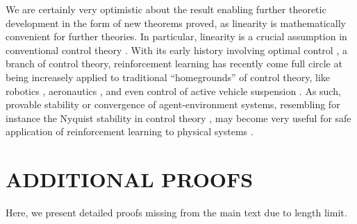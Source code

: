 \documentclass[twoside]{article}
\begin{document}
We are certainly very optimistic about the result enabling further theoretic development in the form of new theorems
proved, as linearity is mathematically convenient for further theories.
In particular, linearity is a crucial assumption in conventional control theory \cite{control-textbook-1,control-textbook-2}. With its early history involving optimal control \cite{Sutton2005ReinforcementLA-mentions-optimal-control}, a branch of control theory, reinforcement learning has recently come full circle at being increasely applied to
traditional ``homegrounds'' of control theory, like robotics \cite{RL-robotics,Li2021ReinforcementLF},
aeronautics \cite{Wang2022DeepRL}, and even control of active vehicle suspension \cite{RL-car-suspension}.
As such, provable stability or convergence of agent-environment systems,
resembling for instance the Nyquist stability in control theory \cite{Valena1980NyquistCF}, may become very useful for safe application of reinforcement learning to physical systems \cite{pmlr-v119-stooke20a,Cheng2019EndtoEndSR}.




\pagebreak

\onecolumn

\setcounter{section}{0}



\section{ADDITIONAL PROOFS}

Here, we present detailed proofs missing from the main text due to length limit.
\end{document}
